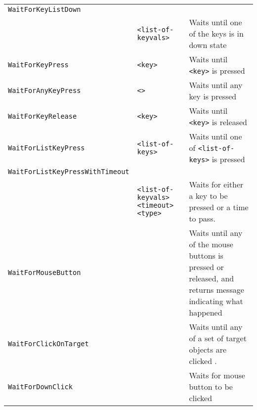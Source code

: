 \begin{longtable}{p{3cm}p{3cm}p{6cm}}
\verb+WaitForKeyListDown+ & & \\ 
& \verb+<list-of-keyvals>+ & Waits until one of the keys is in down state\\ 
\verb+WaitForKeyPress+ &\verb+<key>+ &Waits until \verb+<key>+ is pressed\\ 
\verb+WaitForAnyKeyPress+ &\hspace{0.5cm} \verb+<>+ &Waits until any key is pressed\\ 
\verb+WaitForKeyRelease+ &\hspace{0.5cm} \verb+<key>+ & Waits until \verb+<key>+ is released\\ 
\verb+WaitForListKeyPress+ &\hspace{0.5cm}\verb+<list-of-keys>+ &Waits until one of \verb+<list-of-keys>+ is pressed \\ 
\verb+WaitForListKeyPressWithTimeout+&\\
&\verb+<list-of-keyvals>+ \verb+<timeout>+ \verb+<type>+ & Waits for either a key to be pressed or a time to pass.\\
\verb+WaitForMouseButton+ & &Waits until any of the mouse buttons is pressed or released, and returns message indicating what happened \\ 
\verb+WaitForClickOnTarget+ & &Waits until any of a set of target objects are clicked .\\ 
\verb+WaitForDownClick+ & &Waits for mouse button to be clicked \\ 


\end{longtable}
